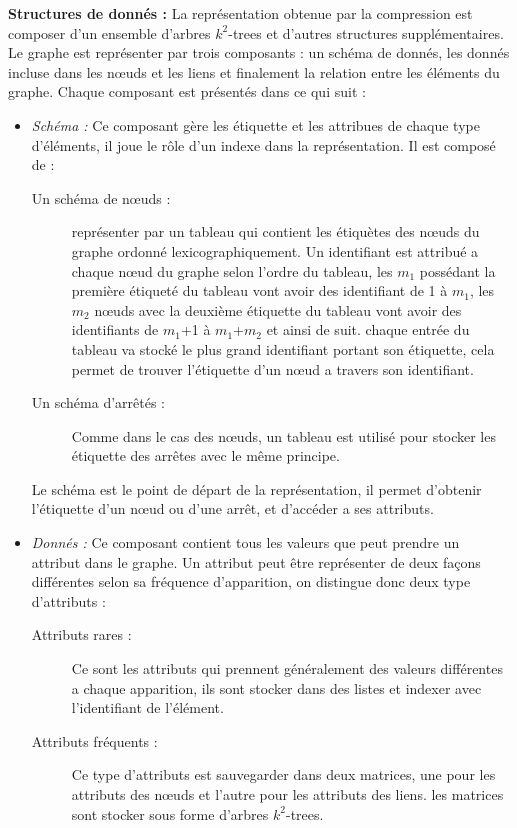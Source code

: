 \textbf{Structures de donnés :} La représentation obtenue par la compression est composer d'un ensemble d'arbres $k^2$-trees et d'autres structures supplémentaires. Le graphe est représenter par trois composants : un schéma de donnés, les donnés incluse dans les nœuds et les liens et finalement la relation entre les éléments du graphe. Chaque composant est présentés dans ce qui suit :
\begin{itemize}
\item \textit{Schéma : } Ce composant gère les étiquette et les attribues de chaque type d'éléments, il joue le rôle d'un indexe dans la représentation. Il est composé de :
\begin{description}
\item[Un schéma de nœuds :] représenter par un tableau qui contient les étiquètes des nœuds du graphe ordonné lexicographiquement. Un identifiant est attribué a chaque nœud du graphe selon l'ordre du tableau, les \textit{$m_1$} possédant la première étiqueté du tableau vont avoir des identifiant de 1 à \textit{$m_1$}, les \textit{$m_2$} nœuds avec la deuxième étiquette du tableau vont avoir des identifiants de \textit{$m_1$}+1 à \textit{$m_1$}+\textit{$m_2$} et ainsi de suit. chaque entrée du tableau va stocké  le plus grand identifiant portant son étiquette, cela permet de trouver l'étiquette d'un nœud a travers son identifiant.
\item[Un schéma d'arrêtés :] Comme dans le cas des nœuds, un tableau est utilisé pour stocker les étiquette des arrêtes avec le même principe.  
\end{description}
Le schéma est le point de départ de la représentation, il permet d'obtenir l'étiquette d'un nœud ou d'une arrêt, et d'accéder a ses attributs.
\item \textit{Donnés :} Ce composant contient tous les valeurs que peut prendre un attribut dans le graphe. Un attribut peut être représenter de deux façons différentes selon sa fréquence d'apparition, on distingue donc deux type d'attributs :
\begin{description}
\item[Attributs rares :] Ce sont les attributs qui prennent généralement des valeurs différentes a chaque apparition, ils sont stocker dans des listes et indexer avec l'identifiant de l'élément.
\item[Attributs fréquents :] Ce type d'attributs est sauvegarder dans deux matrices, une pour les attributs des nœuds et l'autre pour les attributs des liens. les matrices sont stocker sous forme d'arbres $k^2$-trees.

\end{description}
\end{itemize}
